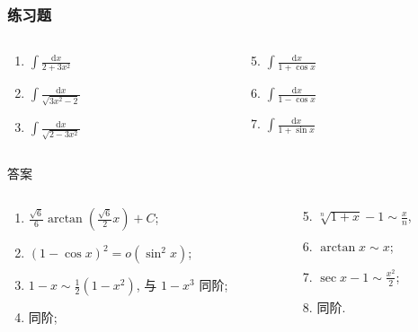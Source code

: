 \documentclass[
10pt,
aspectratio=43,
]{beamer}
\begin{document}
\begin{frame}
	\frametitle{练习题}
	\everymath{\displaystyle}
	\begin{block}{}
		\begin{columns}[onlytextwidth]
			\begin{column}{0.5\textwidth}
				\begin{enumerate}
					\item $\int \frac{\mathrm{d} x}{2+3 x^2}$
					\item $\int \frac{\mathrm{d} x}{\sqrt{3 x^2-2}}$
					\item $\int \frac{\mathrm{d} x}{\sqrt{2-3 x^2}}$
				\end{enumerate}
			\end{column}
			\begin{column}{0.5\textwidth}
				\begin{enumerate}
					\setcounter{enumi}{4}
					\item $\int \frac{\mathrm{d} x}{1+\cos x}$
					\item $\int \frac{\mathrm{d} x}{1-\cos x}$
					\item $\int \frac{\mathrm{d} x}{1+\sin x}$
				\end{enumerate}
			\end{column}
		\end{columns}
	\end{block}
	\begin{exampleblock}{答案}
		\begin{columns}[onlytextwidth]
			\begin{column}{0.5\textwidth}
				\begin{enumerate}
					\item $\frac{\sqrt{6}}{6}\arctan\left(\frac{\sqrt{6}}{2}x\right)+C$;
					      \pause
					\item $(1-\cos x)^2=o(\sin^2 x)$;
					      \pause
					\item $1-x \sim \frac{1}{2}(1-x^2)$, 与 $1-x^3$ 同阶;
					      \pause
					\item 同阶;
				\end{enumerate}
			\end{column}
			\begin{column}{0.5\textwidth}
				\begin{enumerate}
					\setcounter{enumi}{4}
					\pause
					\item $\displaystyle\sqrt[n]{1+x}-1\sim\displaystyle\frac{x}{n}$,
					      \pause
					\item $\arctan x\sim x$;
					      \pause
					\item $\sec x-1\sim\displaystyle\frac{x^2}{2}$;
					      \pause
					\item 同阶.
				\end{enumerate}
			\end{column}
		\end{columns}
	\end{exampleblock}
\end{frame}
\end{document}

